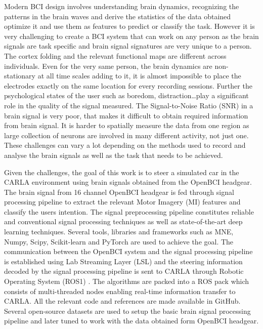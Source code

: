 Modern BCI design involves understanding brain dynamics, recognizing the patterns in the brain waves and derive the statistics of the data obtained optimize it and use them as features to predict or classify the task. However it is very challenging to create a BCI system that can work on any person as the brain signals are task specific and brain signal signatures are very unique to a person. The cortex folding and the relevant functional maps are different across individuals. Even for the very same person, the brain dynamics are non-stationary at all time scales adding to it, it is almost impossible to place the electrodes exactly on the same location for every recording sessions. Further the psychological states of the user such as boredom, distraction\dots play a significant role in the quality of the signal measured. The Signal-to-Noise Ratio (SNR)  in a brain signal is very poor, that makes it difficult to obtain required information from brain signal. It is harder to spatially measure the data from one region as large collection of neurons are involved in many different activity, not just one. These challenges can vary a lot depending on the methods used to record and analyse the brain signals as well as the task that needs to be achieved.

Given the challenges, the goal of this work is to steer a simulated car in the CARLA environment using brain signals obtained from the OpenBCI headgear. The brain signal from 16 channel OpenBCI headgear is fed through signal processing pipeline to extract the relevant Motor Imagery (MI) features and classify the users intention. The signal preprocessing pipeline constitutes reliable and conventional signal processing techniques as well as state-of-the-art deep learning techniques. Several tools, libraries and frameworks such as MNE, Numpy, Scipy, Scikit-learn and PyTorch are used to achieve the goal. The communication between the OpenBCI system and the signal processing pipeline is established using Lab Streaming Layer (LSL)  and the steering information decoded by the signal processing pipeline is sent to CARLA through Robotic Operating System (ROS1) . The algorithms are packed into a ROS pack which consists of multi-threaded nodes enabling real-time information transfer to CARLA. All the relevant code and references are made available in GitHub. Several open-source datasets are used to setup the basic brain signal processing pipeline and later tuned to work with the data obtained form OpenBCI headgear. 

